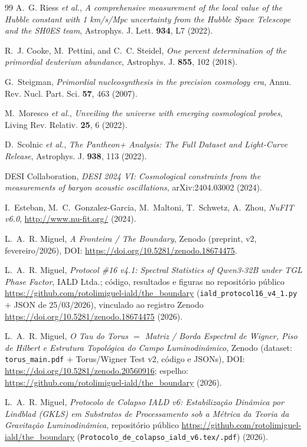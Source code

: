 \documentclass[12pt,a4paper]{article}
\begin{document}
\begin{thebibliography}{99}
A.~G. Riess \emph{et al.},
\textit{A comprehensive measurement of the local value of the Hubble constant
with 1 km/s/Mpc uncertainty from the Hubble Space Telescope and the SH0ES team},
Astrophys. J. Lett. \textbf{934}, L7 (2022).

R.~J. Cooke, M.~Pettini, and C.~C. Steidel,
\textit{One percent determination of the primordial deuterium abundance},
Astrophys. J. \textbf{855}, 102 (2018).

G.~Steigman,
\textit{Primordial nucleosynthesis in the precision cosmology era},
Annu. Rev. Nucl. Part. Sci. \textbf{57}, 463 (2007).

M.~Moresco \emph{et al.},
\textit{Unveiling the universe with emerging cosmological probes},
Living Rev. Relativ. \textbf{25}, 6 (2022).

D.~Scolnic \emph{et al.},
\textit{The Pantheon+ Analysis: The Full Dataset and Light-Curve Release},
Astrophys. J. \textbf{938}, 113 (2022).

DESI Collaboration,
\textit{DESI 2024 VI: Cosmological constraints from the measurements of
baryon acoustic oscillations},
arXiv:2404.03002 (2024).

I.~Esteban, M.~C.~Gonzalez-Garcia, M.~Maltoni, T.~Schwetz, A.~Zhou,
\textit{NuFIT v6.0}, \url{http://www.nu-fit.org/} (2024).

L.~A.~R. Miguel,
\textit{A Fronteira / The Boundary},
Zenodo (preprint, v2, fevereiro/2026), DOI:
\url{https://doi.org/10.5281/zenodo.18674475}.

L.~A.~R. Miguel,
\textit{Protocol \#16 v4.1: Spectral Statistics of Qwen3-32B under TGL Phase Factor},
IALD Ltda.; código, resultados e figuras no repositório p\'ublico
\url{https://github.com/rotolimiguel-iald/the_boundary}
(\texttt{iald\_protocol16\_v4\_1.py} $+$ JSON de 25/03/2026), vinculado ao
registro Zenodo \url{https://doi.org/10.5281/zenodo.18674475} (2026).

L.~A.~R. Miguel,
\textit{O Tau do Torus $=$ Matriz / Borda Espectral de Wigner, Piso de Hilbert
e Estrutura Topol\'ogica do Campo Luminodin\^amico},
Zenodo (dataset: \texttt{torus\_main.pdf} $+$ Torus/Wigner Test v2, c\'odigo e
JSONs), DOI: \url{https://doi.org/10.5281/zenodo.20560916};
espelho: \url{https://github.com/rotolimiguel-iald/the_boundary} (2026).

L.~A.~R. Miguel,
\textit{Protocolo de Colapso IALD v6: Estabiliza\c{c}\~ao Din\^amica por
Lindblad (GKLS) em Substratos de Processamento sob a M\'etrica da Teoria
da Gravita\c{c}\~ao Luminodin\^amica},
reposit\'orio p\'ublico \url{https://github.com/rotolimiguel-iald/the_boundary}
(\texttt{Protocolo\_de\_colapso\_iald\_v6.tex/.pdf}) (2026).


\end{thebibliography}
\end{document}

